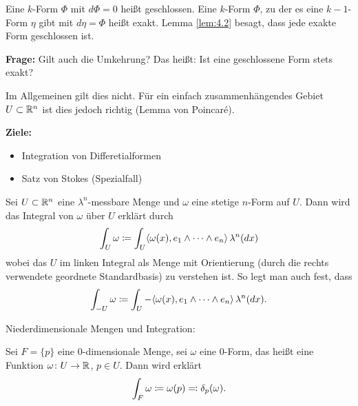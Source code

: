 \documentclass[a4paper,twoside,DIV15,BCOR12mm]{scrbook}
\begin{document}
\begin{bemerkung}
Eine $k$-Form $\Phi$ mit $d\Phi = 0$ heißt geschlossen. Eine $k$-Form $\Phi$, zu der es eine $k-1$-Form $\eta$ gibt mit $d\eta =\Phi$ heißt exakt. Lemma \ref{lem:4.2} besagt, dass jede exakte Form geschlossen ist.

\textbf{Frage:} Gilt auch die Umkehrung? Das heißt: Ist eine geschlossene Form stets exakt? 

Im Allgemeinen gilt dies nicht. Für ein einfach zusammenhängendes Gebiet $U\subset \mathbb{R}^n $ ist dies jedoch richtig (Lemma von Poincaré).
\end{bemerkung}


\textbf{Ziele:}
\begin{itemize}
\item Integration von Differetialformen
\item Satz von Stokes (Spezialfall)
\end{itemize}

\medskip

\begin{definition}
Sei $U\subset \mathbb{R}^n$ eine $\lambda^n$-messbare Menge und $\omega$ eine stetige $n$-Form auf $U$. Dann wird das Integral von $\omega$ über $U$ erklärt durch
\[
\int_U \omega \da  \int_U \langle \omega(x), e_1\wedge \dots \wedge e_n\rangle \, \lambda^n(dx)
\]
wobei das $U$ im linken Integral als Menge mit Orientierung (durch die rechts verwendete geordnete Standardbasis) zu verstehen ist. So legt man auch fest, dass
\[
\int_{-U} \omega \da  \int_U - \langle \omega(x), e_1\wedge \dots \wedge e_n\rangle \, \lambda^n(dx).
\]
\end{definition}

Niederdimensionale Mengen und Integration:
\begin{beispiel}
Sei $F = \{p\}$ eine 0-dimensionale Menge, sei $\omega$ eine 0-Form, das heißt eine Funktion $\omega \colon U\to \mathbb{R}$, $p\in U$. Dann wird erklärt
\[
\int_{F} \omega \da \omega(p) \ad \delta_p(\omega).
\]
\end{beispiel}
\end{document}
